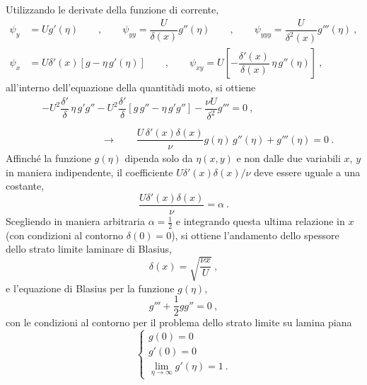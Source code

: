 %
Utilizzando le derivate della funzione di corrente,
\begin{equation}
\begin{aligned}
    \psi_y & = U g'(\eta) \qquad , \qquad \psi_{yy} = \dfrac{U}{\delta(x)}g''(\eta) \qquad ,
    \qquad \psi_{yyy} = \dfrac{U}{\delta^2(x)}g'''(\eta) \ ,  \\
    \psi_x & = U \delta'(x) \left[ g - \eta \, g'(\eta) \right]  \qquad , \qquad
    \psi_{xy} = U \left[ - \dfrac{\delta'(x)}{\delta(x)} \, \eta \, g''(\eta) \right] \ ,
\end{aligned}
\end{equation}
all'interno dell'equazione della quantitàdi moto, si ottiene
\begin{equation}
\begin{aligned}
 & - U^2 \dfrac{\delta'}{\delta} \, \eta \, g'  g'' 
   - U^2 \dfrac{\delta'}{\delta} [ g \, g'' - \eta \, g' g'' ] - \dfrac{ \nu U }{\delta^2} g''' = 0 \ ,\\ \\
 & \qquad \qquad \qquad \rightarrow \qquad
    \dfrac{U \, \delta'(x) \delta(x)}{ \nu } g(\eta) \, g''(\eta) + g'''(\eta) = 0 \ . 
\end{aligned}
\end{equation}
Affinché la funzione $g(\eta)$ dipenda solo da $\eta(x,y)$ e non dalle due variabili $x$, $y$ in maniera indipendente, il coefficiente $U \delta'(x) \delta(x) / \nu$ deve essere uguale a una costante,
\begin{equation}
  \dfrac{U \delta'(x) \delta(x)}{ \nu } = \alpha \  .
\end{equation}
Scegliendo in maniera arbitraria $\alpha = \frac{1}{2}$ e integrando questa ultima relazione in $x$ (con condizioni al contorno $\delta(0) = 0$), si ottiene l'andamento dello spessore dello strato limite laminare di Blasius,
\begin{equation}
 \delta(x) = \sqrt{ \dfrac{ \nu x }{ U } } \ ,
\end{equation}
e l'equazione di Blasius per la funzione $g(\eta)$,
\begin{equation}
 g''' + \frac{1}{2} g g'' = 0 \ ,
\end{equation}
con le condizioni al contorno per il problema dello strato limite su lamina piana
\begin{equation}
 \begin{cases}
 g(0) = 0 \\
 g'(0) = 0 \\
 \lim_{\eta\to \infty}
 g'(\eta) = 1 \ .
 \end{cases}
\end{equation}

